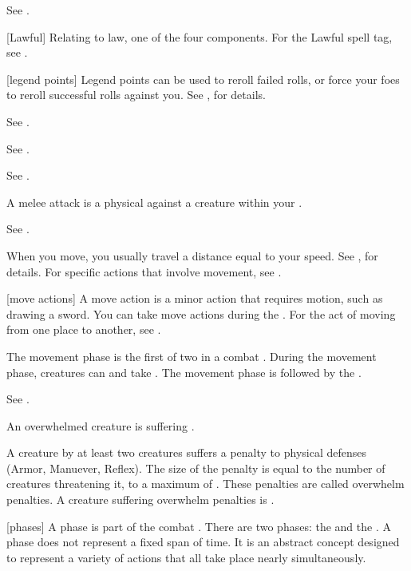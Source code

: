  See .

[Lawful] Relating to law, one of the four  components. For the Lawful spell tag, see .

[legend points] Legend points can be used to reroll failed rolls, or force your foes to reroll successful rolls against you. See , for details.

 See .

 See .

 See .

 A melee attack is a physical  against a creature within your .

 See .

 When you move, you usually travel a distance equal to your speed.
See , for details.
For specific actions that involve movement, see .

[move actions] A move action is a minor action that requires motion, such as drawing a sword.
You can take move actions during the .
For the act of moving from one place to another, see .

 The movement phase is the first of two  in a combat .
During the movement phase, creatures can  and take .
The movement phase is followed by the .

 See .

 An overwhelmed creature is suffering .

 A creature  by at least two creatures suffers a penalty to physical defenses (Armor, Manuever, Reflex).
The size of the penalty is equal to the number of creatures threatening it, to a maximum of .
These penalties are called overwhelm penalties.
A creature suffering overwhelm penalties is .

[phases] A phase is part of the combat .
There are two phases: the  and the .
A phase does not represent a fixed span of time.
It is an abstract concept designed to represent a variety of actions that all take place nearly simultaneously.

